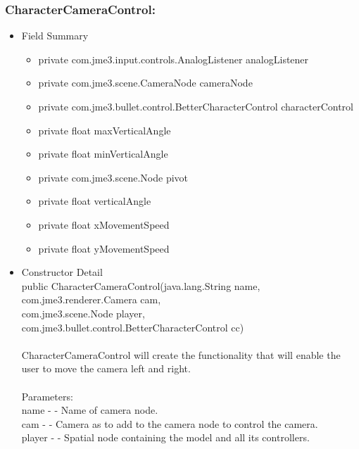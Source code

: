 \documentclass[letterpaper]{article}
\begin{document}
						\subsubsection*{CharacterCameraControl:}
						\vspace{0.1in}
							\begin{itemize}
								\item	Field Summary
										\begin{itemize}
											\item	private com.jme3.input.controls.AnalogListener	analogListener 
											\item	private com.jme3.scene.CameraNode	cameraNode 
											\item	private com.jme3.bullet.control.BetterCharacterControl	characterControl 
											\item	private float	maxVerticalAngle 
											\item	private float	minVerticalAngle 
											\item	private com.jme3.scene.Node	pivot 
											\item	private float	verticalAngle 
											\item	private float	xMovementSpeed 
											\item	private float	yMovementSpeed
										\end{itemize}
								\item	Constructor Detail \\
										public CharacterCameraControl(java.lang.String name, \\
		                     com.jme3.renderer.Camera cam, \\
		                     com.jme3.scene.Node player, \\
		                     com.jme3.bullet.control.BetterCharacterControl cc) \\ \\
										CharacterCameraControl will create the functionality that will enable the user to move the camera left and right. \\ \\
										Parameters: \\
										name - - Name of camera node. \\
										cam - - Camera as to add to the camera node to control the camera. \\
										player - - Spatial node containing the model and all its controllers.

\end{itemize}
\end{document}
